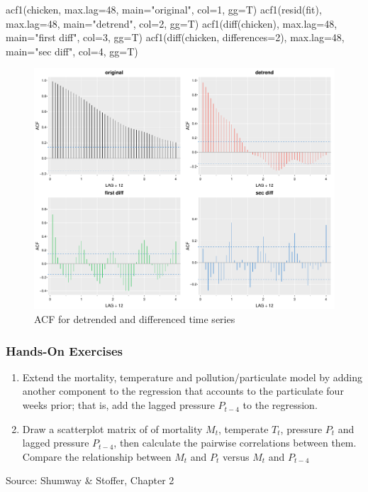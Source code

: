 \begin{Rcode}
acf1(chicken, max.lag=48, main="original", col=1, gg=T)
acf1(resid(fit), max.lag=48, main="detrend", col=2, gg=T)
acf1(diff(chicken), max.lag=48, main="first diff", col=3, gg=T)
acf1(diff(chicken, differences=2), max.lag=48, 
    main="sec diff", col=4, gg=T)
\end{Rcode}

\begin{figure}
\centering
\includegraphics[width=.75\textwidth]{figure41.pdf}
\caption{ACF for detrended and differenced time series}
\label{fig:figure41}
\end{figure}

\begin{tcolorbox}[colback=code]
\subsubsection*{Hands-On Exercises} 
\begin{enumerate}
  \item Extend the mortality, temperature and pollution/particulate model by adding another component to the regression that accounts to the particulate four weeks prior; that is, add the lagged pressure $P_{t-4}$ to the regression.
  \item Draw a scatterplot matrix of of mortality $M_t$, temperate $T_t$, pressure $P_t$ and lagged pressure $P_{t-4}$, then calculate the pairwise correlations between them. Compare the relationship between $M_t$ and $P_t$ versus $M_t$ and $P_{t-4}$
\end{enumerate}

{\footnotesize \vspace{\baselineskip} Source: Shumway \& Stoffer, Chapter 2}
\end{tcolorbox}


